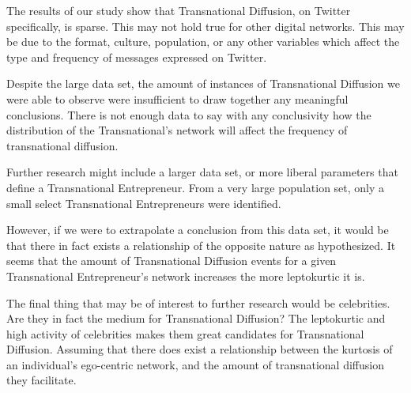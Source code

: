 The results of our study show that Transnational Diffusion, on Twitter
specifically, is sparse. This may not hold true for other digital
networks. This may be due to the format, culture, population, or any
other variables which affect the type and frequency of messages
expressed on Twitter.

Despite the large data set, the amount of instances of Transnational
Diffusion we were able to observe were insufficient to draw together
any meaningful conclusions. There is not enough data to say with any
conclusivity how the distribution of the Transnational's network will
affect the frequency of transnational diffusion.

Further research might include a larger data set, or more liberal
parameters that define a Transnational Entrepreneur. From a very large
population set, only a small select Transnational Entrepreneurs were
identified.

However, if we were to extrapolate a conclusion from this data set, it
would be that there in fact exists a relationship of the opposite
nature as hypothesized. It seems that the amount of Transnational
Diffusion events for a given Transnational Entrepreneur's network
increases the more leptokurtic it is.

The final thing that may be of interest to further research would be
celebrities. Are they in fact the medium for Transnational Diffusion?
The leptokurtic and high activity of celebrities makes them great
candidates for Transnational Diffusion. Assuming that there does exist
a relationship between the kurtosis of an individual's ego-centric
network, and the amount of transnational diffusion they facilitate.